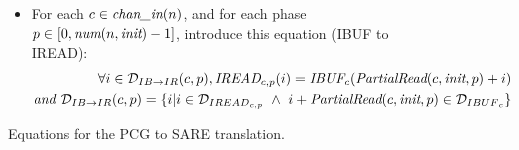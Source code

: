 \begin{figure}[t]
{\begin{minipage}{6.3in}
\begin{itemize}
\begin{align}
\forall (i,j) \in {\cal D}_{SW {\small \rightarrow} SB}(c,p,q), \\ \nonumber
\mt{SBUF}_{c}(i,j) = 
  \mt{SWRITE}_{c, p}(i * \frac{\mt{Period}(c)}{\mt{TotalWrite}(n,c,\mt{steady})} + 
                       \lfloor \frac{q}{S(n)} \rfloor, 
                     q~mod~S(n),
                     j - \mt{Offset}_{SW {\small \rightarrow} SB}(q,n,c,p)) \\ \nonumber
\mt{where } {\cal D}_{SW {\small \rightarrow} SB}(c,p,q) = 
  {\cal D}_{{SBUF}_{c}} \cap 
  \{ (i,j) | \mt{Offset}_{SW {\small \rightarrow} SB}(q,n,c,p) \le j
             \le \mt{Offset}_{SW {\small \rightarrow} SB}(q,n,c,p+1) - 1 \} \\ \nonumber
\mt{and } \mt{Offset}_{SW {\small \rightarrow} SB}(q,n,c,p') = q*\mt{TotalWrite}(n,c,\mt{steady}) + \mt{PartialWrite}(c,\mt{steady},p'))
\end{align}
%
\item For each $c \in \mbox{\it chan\_in}(n)$, and for each phase $p \in
[0, \mbox{\it num}(n, \mbox{\it init})-1]$, introduce this equation (IBUF to IREAD):
\begin{align}
\forall i \in {\cal D}_{IB {\small \rightarrow} IR}(c,p), 
\mbox{\it IREAD}_{c, p}(i) = \mbox{\it IBUF}_{c}(\mbox{\it PartialRead}(c, \mbox{\it init}, p) + i) \\ \nonumber
\mbox{\it and }{\cal D}_{IB {\small \rightarrow} IR}(c,p) = 
  \{ i | i \in {\cal D}_{{IREAD}_{c,p}} ~\wedge~ 
         i + \mbox{\it PartialRead}(c, \mbox{\it init}, p) \in {\cal D}_{{IBUF}_{c}} \}
\end{align}
%
\end{itemize}
\end{minipage}}
\caption{Equations for the PCG to SARE translation.
\protect\label{fig:pcgtosare2}}
\end{figure}

